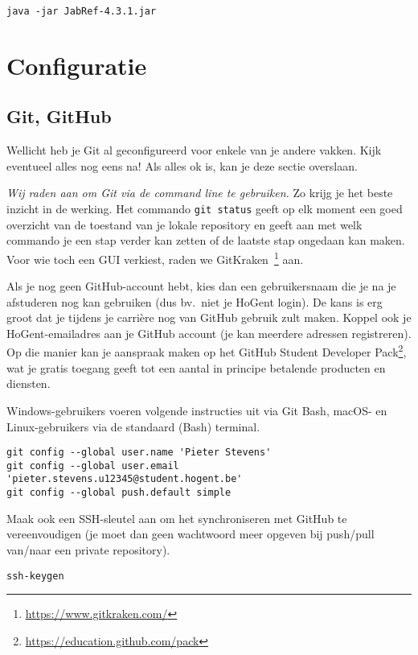 \begin{verbatim}
java -jar JabRef-4.3.1.jar
\end{verbatim}

\section{Configuratie}

\subsection{Git, GitHub}

Wellicht heb je Git al geconfigureerd voor enkele van je andere vakken. Kijk eventueel alles nog eens na! Als alles ok is, kan je deze sectie overslaan.

\emph{Wij raden aan om Git via de command line te gebruiken.} Zo krijg je het beste inzicht in de werking. Het commando \texttt{git status} geeft op elk moment een goed overzicht van de toestand van je lokale repository en geeft aan met welk commando je een stap verder kan zetten of de laatste stap ongedaan kan maken. Voor wie toch een GUI verkiest, raden we GitKraken~\footnote{\url{https://www.gitkraken.com/}} aan.

Als je nog geen GitHub-account hebt, kies dan een gebruikersnaam die je na je afstuderen nog kan gebruiken (dus bv.~niet je HoGent login). De kans is erg groot dat je tijdens je carrière nog van GitHub gebruik zult maken. Koppel ook je HoGent-emailadres aan je GitHub account (je kan meerdere adressen registreren). Op die manier kan je aanspraak maken op het GitHub Student Developer Pack\footnote{\url{https://education.github.com/pack}}, wat je gratis toegang geeft tot een aantal in principe betalende producten en diensten.

Windows-gebruikers voeren volgende instructies uit via Git Bash, macOS- en Linux-gebruikers via de standaard (Bash) terminal.

\begin{verbatim}
git config --global user.name 'Pieter Stevens'
git config --global user.email 'pieter.stevens.u12345@student.hogent.be'
git config --global push.default simple
\end{verbatim}

Maak ook een SSH-sleutel aan om het synchroniseren met GitHub te vereenvoudigen (je moet dan geen wachtwoord meer opgeven bij push/pull van/naar een private repository).

\begin{verbatim}
ssh-keygen
\end{verbatim}

